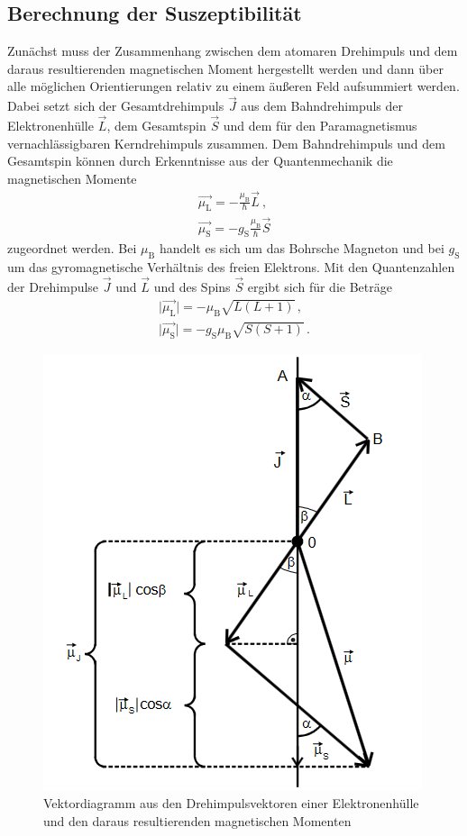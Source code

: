 \subsection{Berechnung der Suszeptibilität}
Zunächst muss der Zusammenhang zwischen dem atomaren Drehimpuls und dem daraus resultierenden magnetischen Moment hergestellt werden und dann über alle möglichen Orientierungen relativ zu einem äußeren
Feld aufsummiert werden. Dabei setzt sich der Gesamtdrehimpuls $\vec{J}$ aus dem Bahndrehimpuls der Elektronenhülle $\vec{L}$, dem Gesamtspin $\vec{S}$ und dem für den Paramagnetismus vernachlässigbaren Kerndrehimpuls zusammen.
Dem Bahndrehimpuls und dem Gesamtspin können durch Erkenntnisse aus der Quantenmechanik die magnetischen Momente
\begin{gather}
    \vec{\mu_\text{L}}= - \frac{\mu_\text{B}}{\hbar} \vec{L} \ , \\
    \vec{\mu_\text{S}}= - g_\text{S}\frac{\mu_\text{B}}{\hbar} \vec{S}
\end{gather} 
zugeordnet werden. Bei $\mu_\text{B}$ handelt es sich um das Bohrsche Magneton und bei $g_\text{S}$ um das gyromagnetische Verhältnis des freien Elektrons.
Mit den Quantenzahlen der Drehimpulse $\vec{J}$ und $\vec{L}$ und des Spins $\vec{S}$ ergibt sich für die Beträge
\begin{gather}
    \lvert \vec{\mu_\text{L}} \rvert = - \mu_\text{B} \sqrt{L\left(L+1\right)} \, , \\
    \lvert \vec{\mu_\text{S}} \rvert = - g_\text{S} \mu_\text{B} \sqrt{S\left(S+1\right)} \, .
\end{gather}
\begin{figure}
    \centering
    \includegraphics[scale=0.4]{pics/Vektor.png}
    \caption{Vektordiagramm aus den Drehimpulsvektoren einer Elektronenhülle und den daraus resultierenden magnetischen Momenten \cite{v606}}
    \label{fig:VE}
  \end{figure}
